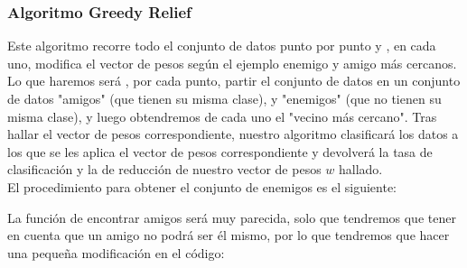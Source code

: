 \documentclass[11pt]{article}
\makeatletter
\def\BState{\State\hskip-\ALG@thistlm}
\makeatother
\begin{document}
\subsubsection{Algoritmo Greedy Relief}
Este algoritmo recorre todo el conjunto de datos punto por punto y , en cada uno, modifica el vector de pesos según el ejemplo enemigo y amigo más cercanos. Lo que haremos será , por cada punto, partir el conjunto de datos en un conjunto de datos "amigos" (que tienen su misma clase), y "enemigos" (que no tienen su misma clase), y luego obtendremos de cada uno el "vecino más cercano". Tras hallar el vector de pesos correspondiente, nuestro algoritmo clasificará los datos a los que se les aplica el vector de pesos correspondiente y devolverá la tasa de clasificación y la de reducción de nuestro vector de pesos $w$ hallado.\\
 El procedimiento para obtener el conjunto de enemigos es el siguiente:

La función de encontrar amigos será muy parecida, solo que tendremos que tener en cuenta que un amigo no podrá ser él mismo, por lo que tendremos que hacer una pequeña modificación en el código:
\end{document}
